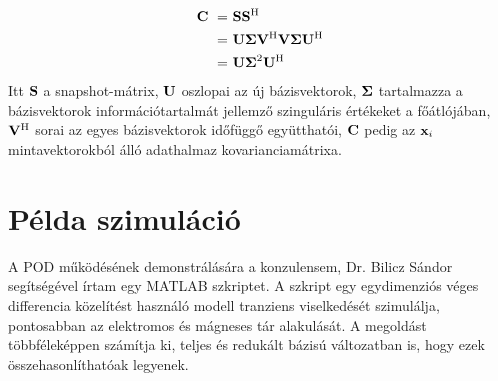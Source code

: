             \begin{align}
            \begin{split}
                \label{equ:kovariancia}
                {\bf C}~=&~{\bf S S^{\mathrm{H}}} \\
                =&~{\bf U \Sigma V^{\mathrm{H}} V\Sigma U^{\mathrm{H}}} \\
                =&~{\bf U \Sigma}^2{\bf U^{\mathrm{H}}}
            \end{split}
            \end{align}
            Itt ${\bf S}$ a snapshot-mátrix, ${\bf U}$ oszlopai az új bázisvektorok, ${\bf \Sigma}$ tartalmazza a bázisvektorok információtartalmát jellemző szinguláris értékeket a főátlójában, ${\bf V^{\mathrm{H}}}$ sorai az egyes bázisvektorok időfüggő együtthatói, ${\bf C}$ pedig az ${\bf x}_i$ mintavektorokból álló adathalmaz kovarianciamátrixa.
    \section{Példa szimuláció}
        A POD működésének demonstrálására a konzulensem, Dr. Bilicz Sándor segítségével írtam egy MATLAB szkriptet. A szkript egy egydimenziós véges differencia közelítést használó modell tranziens viselkedését szimulálja, pontosabban az elektromos és mágneses tár alakulását. A megoldást többféleképpen számítja ki, teljes és redukált bázisú változatban is, hogy ezek összehasonlíthatóak legyenek.
